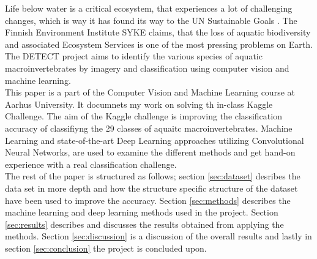 Life below water is a critical ecosystem, that experiences a lot of challenging changes, which is way it has found its way to the UN Sustainable Goals \cite{UN}. The Finnish Environment Institute \cite{meissner} SYKE claims, that the loss of aquatic biodiversity and associated Ecosystem Services is one of the most pressing problems on Earth. The DETECT project aims to identify the various species of aquatic macroinvertebrates by imagery and classification using computer vision and machine learning. \\

This paper is a part of the Computer Vision and Machine Learning course at Aarhus University. It documnets my work on solving th in-class Kaggle Challenge. The aim of the Kaggle challenge is improving the classification accuracy of classifiyng the 29 classes of aquaitc macroinvertebrates. Machine Learning and state-of-the-art Deep Learning approaches utilizing Convolutional Neural Networks, are used to examine the different methods and get hand-on experience with a real classification challenge. \\

The rest of the paper is structured as follows; section \ref{sec:dataset} desribes the data set in more depth and how the structure specific structure of the dataset have been used to improve the accuracy. Section \ref{sec:methods} describes the machine learning and deep learning methods used in the project. Section \ref{sec:results} describes and discusses the results obtained from applying the methods. Section \ref{sec:discussion} is a discussion of the overall results and lastly in section \ref{sec:conclusion} the project is concluded upon.